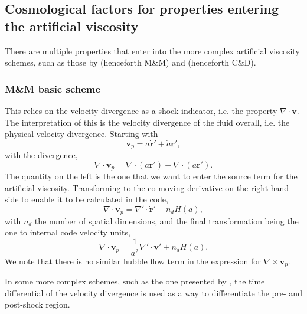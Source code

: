 \subsection{Cosmological factors for properties entering the artificial viscosity}
\label{ssec:artificialvisc}

There are multiple properties that enter into the more complex artificial
viscosity schemes, such as those by \citet{Morris1997} (henceforth M\&M) and
\citet{Cullen2010} (henceforth C\&D).

\subsubsection{M\&M basic scheme}
\label{sssec:mandm}

This relies on the velocity divergence as a shock indicator, i.e. the property
$\nabla \cdot \mathbf{v}$. The interpretation of this is the velocity divergence of
the fluid overall, i.e. the physical velocity divergence. Starting with
\begin{equation}
\mathbf{v}_p = a \dot{\mathbf{r}}' + \dot{a} \mathbf{r}', \nonumber
\end{equation}
with the divergence,
\begin{equation}
\nabla \cdot \mathbf{v}_p =
    \nabla \cdot \left(a \dot{\mathbf{r}}'\right) +
    \nabla \cdot \left(\dot{a} \mathbf{r}'\right). \nonumber
\end{equation}
The quantity on the left is the one that we want to enter the source term for the
artificial viscosity. Transforming to the co-moving derivative on the right hand side
to enable it to be calculated in the code,
\begin{equation}
\nabla \cdot \mathbf{v}_p = 
    \nabla' \cdot \dot{\mathbf{r}}' + n_d H(a),
\label{eqn:divvwithcomovingcoordinates}
\end{equation}
with $n_d$ the number of spatial dimensions, and the final transformation
being the one to internal code velocity units,
\begin{equation}
\nabla \cdot \mathbf{v}_p = 
    \frac{1}{a^2} \nabla' \cdot \mathbf{v}' + n_d H(a).
\label{eqn:divvcodeunits}
\end{equation}
We note that there is no similar hubble flow term in the expression for
$\nabla \times \mathbf{v}_p$.

In some more complex schemes, such as the one presented by \cite{Cullen2010},
the time differential of the velocity divergence is used as a way to differentiate
the pre- and post-shock region.

